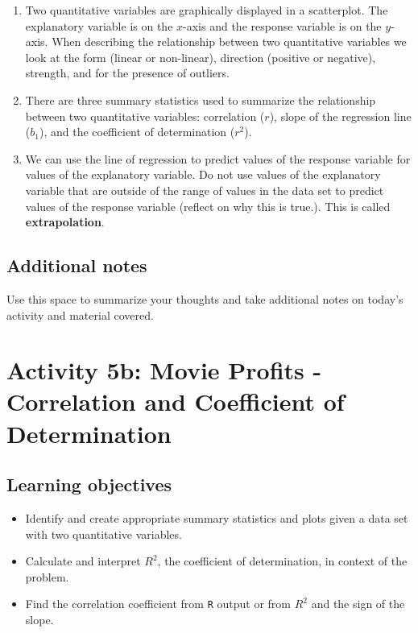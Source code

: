 \documentclass[
]{report}
\begin{document}
\begin{enumerate}
\def\labelenumi{\arabic{enumi}.}
\item
  Two quantitative variables are graphically displayed in a scatterplot. The explanatory variable is on the \(x\)-axis and the response variable is on the \(y\)-axis. When describing the relationship between two quantitative variables we look at the form (linear or non-linear), direction (positive or negative), strength, and for the presence of outliers.
\item
  There are three summary statistics used to summarize the relationship between two quantitative variables: correlation (\(r\)), slope of the regression line (\(b_1\)), and the coefficient of determination (\(r^2\)).
\item
  We can use the line of regression to predict values of the response variable for values of the explanatory variable. Do not use values of the explanatory variable that are outside of the range of values in the data set to predict values of the response variable (reflect on why this is true.). This is called \textbf{extrapolation}.
\end{enumerate}

\newpage

\hypertarget{additional-notes-5}{%
\subsection{Additional notes}\label{additional-notes-5}}

Use this space to summarize your thoughts and take additional notes on today's activity and material covered.

\newpage

\hypertarget{activity-5b-movie-profits---correlation-and-coefficient-of-determination}{%
\section{Activity 5b: Movie Profits - Correlation and Coefficient of Determination}\label{activity-5b-movie-profits---correlation-and-coefficient-of-determination}}


\hypertarget{learning-objectives-4}{%
\subsection{Learning objectives}\label{learning-objectives-4}}

\begin{itemize}
\item
  Identify and create appropriate summary statistics and plots
  given a data set with two quantitative variables.
\item
  Calculate and interpret \(R^2\), the coefficient of determination, in context of the problem.
\item
  Find the correlation coefficient from \texttt{R} output or from \(R^2\) and the sign of the slope.
\end{itemize}
\end{document}
